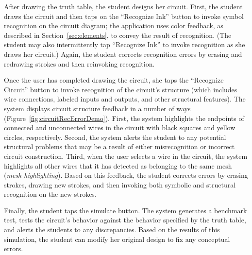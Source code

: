 \documentclass{elsart}
\begin{document}
After drawing the truth table, the student designs her circuit.
First, the student draws the circuit and then taps on the ``Recognize
Ink'' button to invoke symbol recognition on the circuit diagram; the
application uses color feedback, as described in
Section~\ref{sec:elements}, to convey the result of recognition.  (The
student may also intermittently tap ``Recognize Ink'' to invoke
recognition as she draws her circuit.)  Again, the student corrects
recognition errors by erasing and redrawing strokes and then
reinvoking recognition.  

Once the user has completed drawing the circuit, she taps the
``Recognize Circuit'' button to invoke recognition of the circuit's
structure (which includes wire connections, labeled inputs and
outputs, and other structural features).  The system displays circuit
structure feedback in a number of ways
(Figure~\ref{fig:circuitRecErrorDemo}).  First, the system highlights
the endpoints of connected and unconnected wires in the circuit with
black squares and yellow circles, respectively.
Second, the system alerts the student to any potential structural
problems that may be a result of either misrecognition or incorrect
circuit construction.  Third, when the user selects a wire in the
circuit, the system highlights all other wires that it has detected as
belonging to the same mesh (\textit{mesh highlighting}).  Based on
this feedback, the student corrects errors by erasing strokes, drawing
new strokes, and then invoking both symbolic and structural
recognition on the new strokes.

Finally, the student taps the simulate button.  The system generates
a benchmark test, tests the circuit's behavior against the behavior
specified by the truth table, and alerts the students to any
discrepancies.  Based on the results of this simulation, the student
can modify her original design to fix any conceptual errors.
\end{document}
